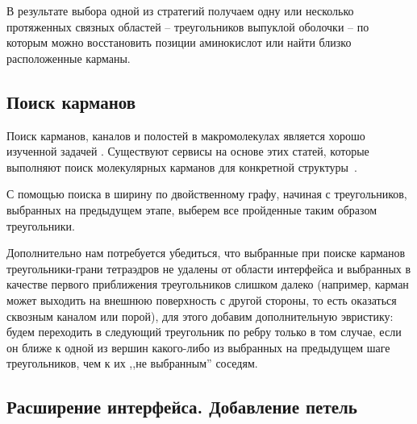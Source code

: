 В результате выбора одной из стратегий получаем одну или несколько протяженных связных областей -- треугольников выпуклой оболочки -- по которым можно восстановить позиции аминокислот или найти близко расположенные карманы.

\subsection{Поиск карманов}
Поиск карманов, каналов и полостей в макромолекулах является хорошо изученной задачей \cite{alpha_shapes1995, alpha_shapes1998, caver2007, ppi_kim2006}. Существуют сервисы на основе этих статей, которые выполняют поиск молекулярных карманов для конкретной структуры~\cite{castp}. 

С помощью поиска в ширину по двойственному графу, начиная с треугольников, выбранных на предыдущем этапе, выберем все пройденные таким образом треугольники.

Дополнительно нам потребуется убедиться, что выбранные при поиске карманов треугольники-грани тетраэдров не удалены от области интерфейса и выбранных в качестве первого приближения треугольников слишком далеко (например, карман может выходить на внешнюю поверхность с другой стороны, то есть оказаться сквозным каналом или порой), для этого добавим дополнительную эвристику: будем переходить в следующий треугольник по ребру только в том случае, если он ближе к одной из вершин какого-либо из выбранных на предыдущем шаге треугольников, чем к их ,,не выбранным'' соседям.

\subsection{Расширение интерфейса. Добавление петель}

